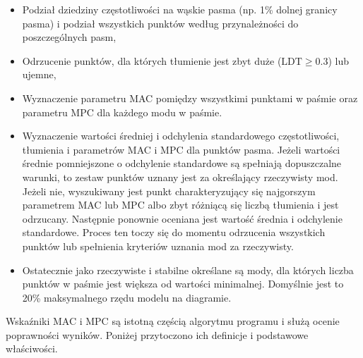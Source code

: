 \begin{itemize}
	\item Podział dziedziny częstotliwości na wąskie pasma (np. 1\% dolnej granicy pasma) i podział wszystkich punktów według przynależności do poszczególnych pasm,
	\item Odrzucenie punktów, dla których tłumienie jest zbyt duże ($\text{LDT}\ge0.3$) lub ujemne,
	\item Wyznaczenie parametru MAC pomiędzy wszystkimi punktami w paśmie oraz parametru MPC dla każdego modu w paśmie.
	\item Wyznaczenie wartości średniej i odchylenia standardowego częstotliwości, tłumienia i parametrów MAC i MPC dla punktów pasma. Jeżeli wartości średnie pomniejszone o odchylenie standardowe są spełniają dopuszczalne warunki, to zestaw punktów uznany jest za określający rzeczywisty mod. Jeżeli nie, wyszukiwany jest punkt charakteryzujący się najgorszym parametrem MAC lub MPC albo zbyt różniącą się liczbą tłumienia i jest odrzucany. Następnie ponownie oceniana jest wartość średnia i odchylenie standardowe. Proces ten toczy się do momentu odrzucenia wszystkich punktów lub spełnienia kryteriów uznania mod za rzeczywisty.
	\item Ostatecznie jako rzeczywiste i stabilne określane są mody, dla których liczba punktów w paśmie jest większa od wartości minimalnej. Domyślnie jest to 20\% maksymalnego rzędu modelu na diagramie.
\end{itemize}
Wskaźniki MAC i MPC są istotną częścią algorytmu programu i służą ocenie poprawności wyników. Poniżej przytoczono ich definicje i podstawowe właściwości. 

